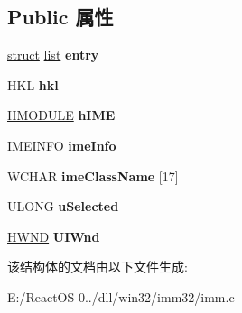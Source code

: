 \subsection*{Public 属性}
\begin{DoxyCompactItemize}
\item 
\mbox{\label{struct__tag_imm_hkl_ae850ca94d1fce870b194d7a249bda419}} 
\hyperlink{interfacestruct}{struct} \hyperlink{classlist}{list} {\bfseries entry}
\item 
\mbox{\label{struct__tag_imm_hkl_ad06578c4ec9fe1cee97df10ff732415a}} 
H\+KL {\bfseries hkl}
\item 
\mbox{\label{struct__tag_imm_hkl_a139f90884bdead64bc75d3d25d5cce76}} 
\hyperlink{interfacevoid}{H\+M\+O\+D\+U\+LE} {\bfseries h\+I\+ME}
\item 
\mbox{\label{struct__tag_imm_hkl_a6613e7a046bf5084abbcd4f2ffa53b61}} 
\hyperlink{struct__tag_i_m_e_i_n_f_o}{I\+M\+E\+I\+N\+FO} {\bfseries ime\+Info}
\item 
\mbox{\label{struct__tag_imm_hkl_a3d674e764de1289a9f4c1024c3641915}} 
W\+C\+H\+AR {\bfseries ime\+Class\+Name} \mbox{[}17\mbox{]}
\item 
\mbox{\label{struct__tag_imm_hkl_a43d2804d0163b9f79e92c864d8c43d91}} 
U\+L\+O\+NG {\bfseries u\+Selected}
\item 
\mbox{\label{struct__tag_imm_hkl_a47b8a8bc19489eb6176d7a64406e7db9}} 
\hyperlink{interfacevoid}{H\+W\+ND} {\bfseries U\+I\+Wnd}
\end{DoxyCompactItemize}


该结构体的文档由以下文件生成\+:\begin{DoxyCompactItemize}
\item 
E\+:/\+React\+O\+S-\/0../dll/win32/imm32/imm.\+c\end{DoxyCompactItemize}
